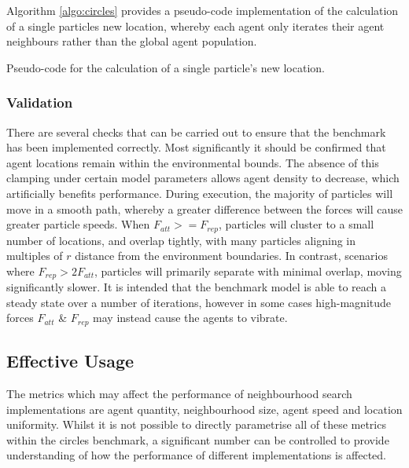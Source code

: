      Algorithm \ref{algo:circles} provides a pseudo-code implementation of the calculation of a single particles new location, whereby each agent only iterates their agent neighbours rather than the global agent population.

\vspace{0.2cm}
\begin{algorithm}

\caption{\label{algo:circles}Pseudo-code for the calculation of a single particle's new location.}
\end{algorithm}
\vspace{-0.2cm}

        
    \subsubsection{Validation}
      There are several checks that can be carried out to ensure that the benchmark has been implemented correctly. Most significantly it should be confirmed that agent locations remain within the environmental bounds. The absence of this clamping under certain model parameters allows agent density to decrease, which artificially benefits performance. During execution, the majority of particles will move in a smooth path, whereby a greater difference between the forces will cause greater particle speeds. When $F_{att} >= F_{rep}$, particles will cluster to a small number of locations, and overlap tightly, with many particles aligning in multiples of $r$ distance from the environment boundaries. In contrast, scenarios where $F_{rep} > 2F_{att}$, particles will primarily separate with minimal overlap, moving significantly slower. It is intended that the benchmark model is able to reach a steady state over a number of iterations, however in some cases high-magnitude forces $F_{att}$ \& $F_{rep}$ may instead cause the agents to vibrate. 
  
  \subsection{Effective Usage\label{sec:effective-usage}}  
\vspace{-0.3cm}
    The metrics which may affect the performance of neighbourhood search implementations are agent quantity, neighbourhood size, agent speed and location uniformity. Whilst it is not possible to directly parametrise all of these metrics within the circles benchmark, a significant number can be controlled to provide understanding of how the performance of different implementations is affected.
    
